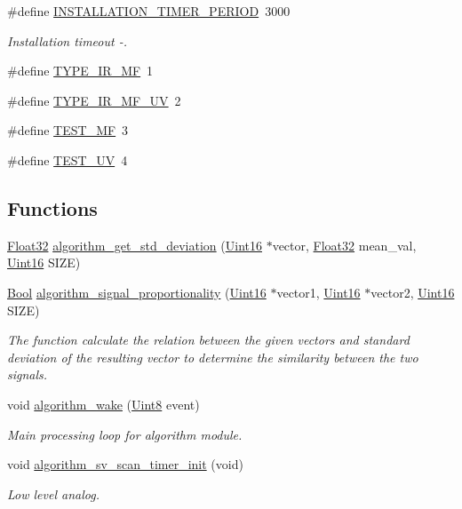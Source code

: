 \begin{DoxyCompactItemize}
\#define \hyperlink{a00016_a8c68dd8d7078113e9f088011171f492c}{I\+N\+S\+T\+A\+L\+L\+A\+T\+I\+O\+N\+\_\+\+T\+I\+M\+E\+R\+\_\+\+P\+E\+R\+I\+O\+D}~3000
\begin{DoxyCompactList}\small\item\em Installation timeout -\/. \end{DoxyCompactList}\item 
\#define \hyperlink{a00016_a78bbb321092eab3b988cf0c89bf0a572}{T\+Y\+P\+E\+\_\+\+I\+R\+\_\+\+M\+F}~1
\item 
\#define \hyperlink{a00016_a88096870f430e03f71e1f390c67f09ce}{T\+Y\+P\+E\+\_\+\+I\+R\+\_\+\+M\+F\+\_\+\+U\+V}~2
\item 
\#define \hyperlink{a00016_a73581885168dab0a1659db63d135b1cc}{T\+E\+S\+T\+\_\+\+M\+F}~3
\item 
\#define \hyperlink{a00016_aa48458d081f4a50e025e7d67a92f31f5}{T\+E\+S\+T\+\_\+\+U\+V}~4
\end{DoxyCompactItemize}
\subsection*{Functions}
\begin{DoxyCompactItemize}
\item 
\hyperlink{a00072_a87d38f886e617ced2698fc55afa07637}{Float32} \hyperlink{a00016_a97eb6437dda088f144d791e49cd3dc2a}{algorithm\+\_\+get\+\_\+std\+\_\+deviation} (\hyperlink{a00072_a59a9f6be4562c327cbfb4f7e8e18f08b}{Uint16} $\ast$vector, \hyperlink{a00072_a87d38f886e617ced2698fc55afa07637}{Float32} mean\+\_\+val, \hyperlink{a00072_a59a9f6be4562c327cbfb4f7e8e18f08b}{Uint16} S\+I\+Z\+E)
\item 
\hyperlink{a00072_a253b248072cfc8bd812c69acd0046eed}{Bool} \hyperlink{a00016_a2925c58a9c3f5d3c957eaca9a95a6c3a}{algorithm\+\_\+signal\+\_\+proportionality} (\hyperlink{a00072_a59a9f6be4562c327cbfb4f7e8e18f08b}{Uint16} $\ast$vector1, \hyperlink{a00072_a59a9f6be4562c327cbfb4f7e8e18f08b}{Uint16} $\ast$vector2, \hyperlink{a00072_a59a9f6be4562c327cbfb4f7e8e18f08b}{Uint16} S\+I\+Z\+E)
\begin{DoxyCompactList}\small\item\em The function calculate the relation between the given vectors and standard deviation of the resulting vector to determine the similarity between the two signals. \end{DoxyCompactList}\item 
void \hyperlink{a00016_a42ed16c7ef20e0c0031fe7ba7ae377b3}{algorithm\+\_\+wake} (\hyperlink{a00072_af84840501dec18061d18a68c162a8fa2}{Uint8} event)
\begin{DoxyCompactList}\small\item\em Main processing loop for algorithm module. \end{DoxyCompactList}\item 
void \hyperlink{a00016_ab898d2d804c49cb0978d26f6af64e0e4}{algorithm\+\_\+sv\+\_\+scan\+\_\+timer\+\_\+init} (void)
\begin{DoxyCompactList}\small\item\em Low level analog. \end{DoxyCompactList}\end{DoxyCompactItemize}
